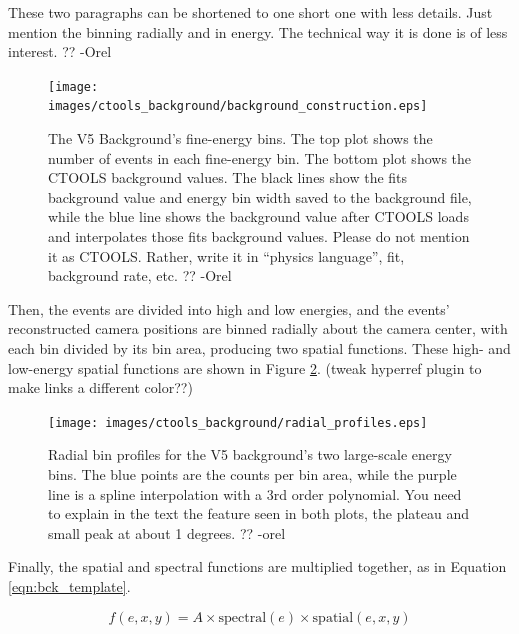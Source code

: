     {\color{red}These two paragraphs can be shortened to one short one with less details. Just mention the binning radially and in energy. The technical way it is done is of less interest. ?? -Orel}

    \begin{figure}[ht]
      \centering
      \texttt{[image: images/ctools\_background/background\_construction.eps]}
      \caption[CTOOLS Background Fine Energy Bins]{
        The V5 Background's fine-energy bins.
        The top plot shows the number of events in each fine-energy bin.
        The bottom plot shows the CTOOLS background values.
        The black lines show the fits background value and energy bin width saved to the background file, while the blue line shows the background value after CTOOLS loads and interpolates those fits background values.
        {\color{red}Please do not mention it as CTOOLS. Rather, write it in “physics language”, fit, background rate, etc. ?? -Orel}
      }
      \label{fig:background_profile}
    \end{figure}

    Then, the events are divided into high and low energies, and the events' reconstructed camera positions are binned radially about the camera center, with each bin divided by its bin area, producing two spatial functions.
    These high- and low-energy spatial functions are shown in Figure \ref{fig:background_radial}.
    {\color{red}(tweak hyperref plugin to make links a different color??)}
    
    \begin{figure}[ht]
      \centering
      \texttt{[image: images/ctools\_background/radial\_profiles.eps]}
      \caption[CTOOLS Radial Background Profiles]{
        Radial bin profiles for the V5 background's two large-scale energy bins.
        The blue points are the counts per bin area, while the purple line is a spline interpolation with a 3rd order polynomial.
        {\color{red}You need to explain in the text the feature seen in both plots, the plateau and small peak at about 1 degrees. ?? -orel}
        }
      \label{fig:background_radial}
    \end{figure}
    
    Finally, the spatial and spectral functions are multiplied together, as in Equation \ref{eqn:bck_template}.
    
    \begin{equation}\label{eqn:bck_template}
      f(e,x,y) = A \times \textrm{spectral}(e) \times \textrm{spatial}(e,x,y) 
    \end{equation} 
    
